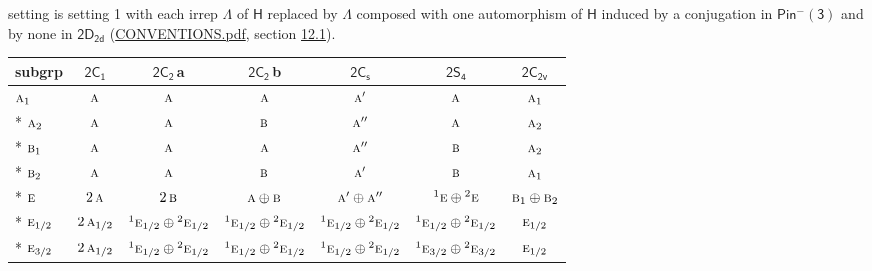 \documentclass[10pt,a4paper]{article}
\numberwithin{equation}{section}
\newcommand{\grp}[1]{\mathsf{#1}}
\newcommand{\irr}[1]{\text{\normalfont\scshape #1}}
\newcommand{\conjpair}[1]{{}^{#1}}
\newcommand{\clsletter}[1]{\,{\scriptsize\color{black!55}#1}}
\begin{document}
setting is setting 1 with each irrep $\Lambda$ of $\grp{H}$ replaced by $\Lambda$ composed with one automorphism of $\grp{H}$ induced by a conjugation in \href{Pinminus3.pdf}{$\grp{Pin^{-}(3)}$} and by none in $\grp{2D_{2d}}$ (\href{../../CONVENTIONS.pdf}{CONVENTIONS.pdf}, section \href{../../../rotation/CONVENTIONS.pdf\#conv.12.1}{12.1}).
{\small\begin{longtable}{@{}lcccccc@{}}\toprule
subgrp & \href{2C1.pdf}{$\grp{2C_{1}}$} & \href{2C2.pdf}{$\grp{2C_{2}}$}\clsletter{a} & \href{2C2.pdf}{$\grp{2C_{2}}$}\clsletter{b} & \href{2C1v.pdf}{$\grp{2C_{s}}$} & \href{2S4.pdf}{$\grp{2S_{4}}$} & \href{2C2v.pdf}{$\grp{2C_{2v}}$}\\\midrule\endhead
\bottomrule\endfoot\endlastfoot
$\irr{a}_{1}$ & $\irr{a}$ & $\irr{a}$ & $\irr{a}$ & $\irr{a}'$ & $\irr{a}$ & $\irr{a}_{1}$\\*
$\irr{a}_{2}$ & $\irr{a}$ & $\irr{a}$ & $\irr{b}$ & $\irr{a}''$ & $\irr{a}$ & $\irr{a}_{2}$\\*
$\irr{b}_{1}$ & $\irr{a}$ & $\irr{a}$ & $\irr{a}$ & $\irr{a}''$ & $\irr{b}$ & $\irr{a}_{2}$\\*
$\irr{b}_{2}$ & $\irr{a}$ & $\irr{a}$ & $\irr{b}$ & $\irr{a}'$ & $\irr{b}$ & $\irr{a}_{1}$\\*
$\irr{e}$ & $2\,\irr{a}$ & $2\,\irr{b}$ & $\irr{a}\oplus \irr{b}$ & $\irr{a}'\oplus \irr{a}''$ & $\conjpair{1}\irr{e}\oplus \conjpair{2}\irr{e}$ & $\irr{b}_{1}\oplus \irr{b}_{2}$\\*
$\irr{e}_{1/2}$ & $2\,\irr{a}_{1/2}$ & $\conjpair{1}\irr{e}_{1/2}\oplus \conjpair{2}\irr{e}_{1/2}$ & $\conjpair{1}\irr{e}_{1/2}\oplus \conjpair{2}\irr{e}_{1/2}$ & $\conjpair{1}\irr{e}_{1/2}\oplus \conjpair{2}\irr{e}_{1/2}$ & $\conjpair{1}\irr{e}_{1/2}\oplus \conjpair{2}\irr{e}_{1/2}$ & $\irr{e}_{1/2}$\\*
$\irr{e}_{3/2}$ & $2\,\irr{a}_{1/2}$ & $\conjpair{1}\irr{e}_{1/2}\oplus \conjpair{2}\irr{e}_{1/2}$ & $\conjpair{1}\irr{e}_{1/2}\oplus \conjpair{2}\irr{e}_{1/2}$ & $\conjpair{1}\irr{e}_{1/2}\oplus \conjpair{2}\irr{e}_{1/2}$ & $\conjpair{1}\irr{e}_{3/2}\oplus \conjpair{2}\irr{e}_{3/2}$ & $\irr{e}_{1/2}$\\
\bottomrule\end{longtable}}
\end{document}
